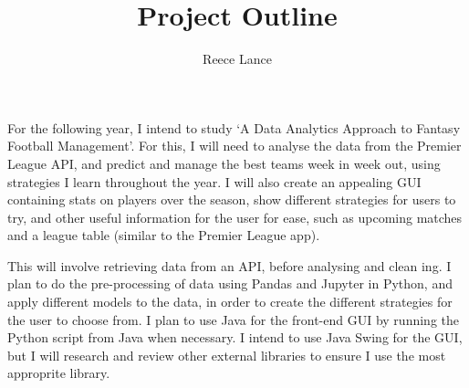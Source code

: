 \documentclass[12pt, a4paper,oneside]{book}
\begin{document}
\title{Project Outline}
\author{Reece Lance}

\maketitle

For the following year, I intend to study `A Data Analytics Approach
to Fantasy Football Management'. For this, I will need to analyse the data
from the Premier League API, and predict and manage the best teams week
in week out, using strategies I learn throughout the year. I will also create
an appealing GUI containing stats on players over the season, show different
strategies for users to try, and other useful information for the user for ease,
such as upcoming matches and a league table (similar to the Premier League
app).

This will involve retrieving data from an API, before analysing and clean
ing. I plan to do the pre-processing of data using Pandas and Jupyter in
Python, and apply different models to the data, in order to create the different
strategies for the user to choose from. I plan to use Java for the front-end
GUI by running the Python script from Java when necessary. I intend to
use Java Swing for the GUI, but I will research and review other external
libraries to ensure I use the most approprite library.
\end{document}

